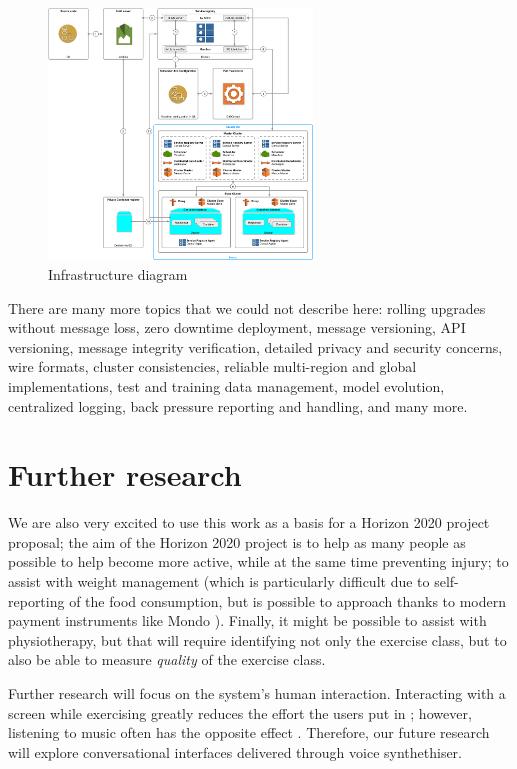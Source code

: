 \documentclass[a4paper, 10 pt, conference]{IEEEtran}
\begin{document}
\begin{figure}[h]
    \begin{center}
        \caption{Infrastructure diagram}
        \label{fig:infrastructure}
        \includegraphics[width=7cm,keepaspectratio]{ri-infrastructure.png}
    \end{center}
\end{figure}

There are many more topics that we could not describe here: rolling upgrades without message loss, zero downtime deployment, message versioning, API versioning, message integrity verification, detailed privacy and security concerns, wire formats, cluster consistencies, reliable multi-region and global implementations, test and training data management, model evolution, centralized logging, back pressure reporting and handling, and many more. 

\section{Further research}

We are also very excited to use this work as a basis for a Horizon 2020 \cite{horizon2020} project proposal; the aim of the Horizon 2020 project is to help as many people as possible to help become more active, while at the same time preventing injury; to assist with weight management (which is particularly difficult due to self-reporting of the food consumption, but is possible to approach thanks to modern payment instruments like Mondo \cite{mondo}). Finally, it might be possible to assist with physiotherapy, but that will require identifying not only the exercise class, but to also be able to measure \emph{quality} of the exercise class.

Further research will focus on the system's human interaction. Interacting with a screen while exercising greatly reduces the effort the users put in \cite{!!!}; however, listening to music often has the opposite effect \cite{!!!}. Therefore, our future research will explore conversational interfaces delivered through voice synthethiser. 
\end{document}
